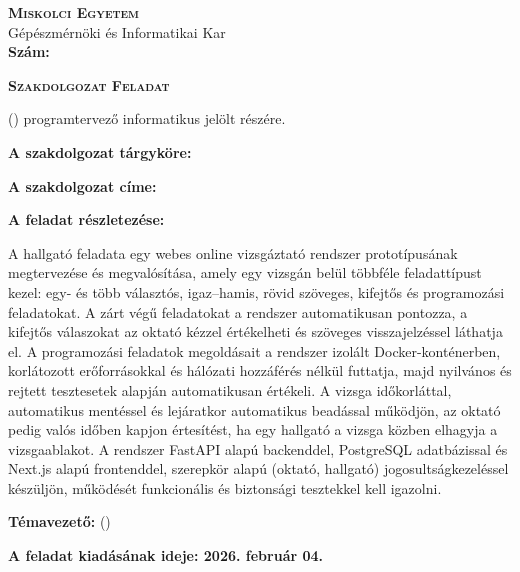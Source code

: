 \noindent
\textsc{\textbf{Miskolci Egyetem}}\\
Gépészmérnöki és Informatikai Kar\\
\tanszek\hspace*{4cm}\hfil \textbf{Szám:}

\vspace{0.5cm}
\begin{center}
\large\textsc{\textbf{Szakdolgozat Feladat}}
\end{center}
\vspace{0.5cm}

\hallgatoNev{} (\neptunKod) programtervező informatikus jelölt részére.

\bigskip
\noindent\textbf{A szakdolgozat tárgyköre:} \targykor

\bigskip
\noindent\textbf{A szakdolgozat címe:} \dolgozatCim

\bigskip
\noindent\textbf{A feladat részletezése:}

\medskip

A hallgató feladata egy webes online vizsgáztató rendszer prototípusának megtervezése és
megvalósítása, amely egy vizsgán belül többféle feladattípust kezel: egy- és több választós,
igaz--hamis, rövid szöveges, kifejtős és programozási feladatokat. A zárt végű feladatokat a
rendszer automatikusan pontozza, a kifejtős válaszokat az oktató kézzel értékelheti és szöveges
visszajelzéssel láthatja el. A programozási feladatok megoldásait a rendszer izolált
Docker-konténerben, korlátozott erőforrásokkal és hálózati hozzáférés nélkül futtatja, majd
nyilvános és rejtett tesztesetek alapján automatikusan értékeli. A vizsga időkorláttal,
automatikus mentéssel és lejáratkor automatikus beadással működjön, az oktató pedig valós időben
kapjon értesítést, ha egy hallgató a vizsga közben elhagyja a vizsgaablakot. A rendszer FastAPI
alapú backenddel, PostgreSQL adatbázissal és Next.js alapú frontenddel, szerepkör alapú
(oktató, hallgató) jogosultságkezeléssel készüljön, működését funkcionális és biztonsági
tesztekkel kell igazolni.

\vfill

\noindent\textbf{Témavezető:} \temavezetoNev{} (\temavezetoBeosztas)


\bigskip
\noindent\textbf{A feladat kiadásának ideje: 2026. február 04.}

